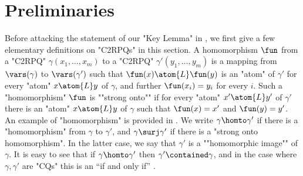 \section{\AP{}Preliminaries}
\label{sec:prelim}

Before attacking the statement of our "Key Lemma" in ,
we first give a few elementary definitions on "C2RPQs" in this section.
%
\AP
A homomorphism $\fun$ from a "C2RPQ" $\gamma(x_1, \dotsc, x_m)$ to a "C2RPQ" $\gamma'(y_1, \dotsc, y_m)$ is a mapping from $\vars(\gamma)$ to $\vars(\gamma')$ such that $\fun(x) \atom{L} \fun(y)$ is an "atom" of $\gamma'$ for every "atom" $x \atom{L} y$ of $\gamma$, and further $\fun(x_i)=y_i$ for every $i$.
Such a "homomorphism" $\fun$ is \AP""strong onto"" if for every "atom" $x' \atom{L} y'$ of $\gamma'$ there is an "atom" $x \atom{L} y$ of $\gamma$ such that $\fun(x)=x'$ and $\fun(y)=y'$.
An example of "homomorphism" is provided in .
We write $\gamma \homto \gamma'$ if there is a "homomorphism" from $\gamma$ to $\gamma'$, and $\gamma \surj \gamma'$ if there is a "strong onto homomorphism".
In the latter case, we say that $\gamma'$ is a \AP""homomorphic image"" of $\gamma$.
It is easy to see that if $\gamma \homto \gamma'$ then $\gamma' \contained \gamma$, and in the case where $\gamma,\gamma'$ are "CQs" this is an ``if and only if'' \cite[Lemma~13]{DBLP:conf/stoc/ChandraM77}.
%
